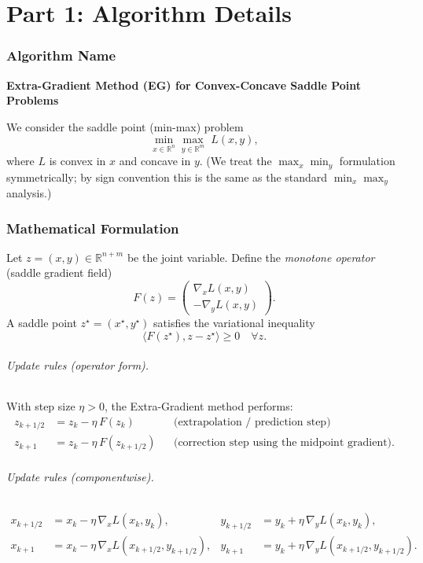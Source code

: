 \documentclass{article}
\begin{document}
\part*{Part 1: Algorithm Details}

\section*{Algorithm Name}
\textbf{Extra-Gradient Method (EG) for Convex-Concave Saddle Point Problems}

We consider the saddle point (min-max) problem
\[
\min_{x \in \mathbb{R}^n} \max_{y \in \mathbb{R}^m} \; L(x,y),
\]
where $L$ is convex in $x$ and concave in $y$. (We treat the
$\max_x \min_y$ formulation symmetrically; by sign convention this is the
same as the standard $\min_x \max_y$ analysis.)

\section*{Mathematical Formulation}

Let $z = (x,y) \in \mathbb{R}^{n+m}$ be the joint variable. Define the
\emph{monotone operator} (saddle gradient field)
\[
F(z) = \begin{pmatrix} \nabla_x L(x,y) \\ -\nabla_y L(x,y) \end{pmatrix}.
\]
A saddle point $z^\star = (x^\star,y^\star)$ satisfies the variational
inequality
\[
\langle F(z^\star), z - z^\star \rangle \geq 0 \quad \forall z.
\]

\paragraph{Update rules (operator form).}
With step size $\eta > 0$, the Extra-Gradient method performs:
\begin{align}
z_{k+1/2} &= z_k - \eta\, F(z_k) && \text{(extrapolation / prediction step)}\\
z_{k+1}   &= z_k - \eta\, F(z_{k+1/2}) && \text{(correction step using the midpoint gradient)}.
\end{align}

\paragraph{Update rules (componentwise).}
\begin{align}
x_{k+1/2} &= x_k - \eta\, \nabla_x L(x_k,y_k), &
y_{k+1/2} &= y_k + \eta\, \nabla_y L(x_k,y_k),\\
x_{k+1}   &= x_k - \eta\, \nabla_x L(x_{k+1/2},y_{k+1/2}), &
y_{k+1}   &= y_k + \eta\, \nabla_y L(x_{k+1/2},y_{k+1/2}).
\end{align}
\end{document}
